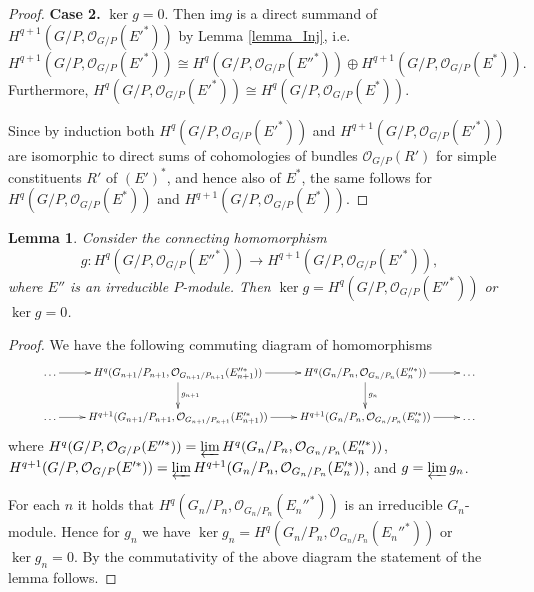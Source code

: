 \documentclass[12pt]{article}
\newcommand{\im} {\mathrm{im}}
\def \OO {{\mathcal O}}
\newtheorem{lemma}[theorem]{Lemma}
\begin{document}
\begin{proof}
{\bf Case 2.} $\ker g = 0$. Then $\im g$ is a direct summand of $H^{q+1}(G/P, \OO_{G/P}(E'^*))$ by Lemma \ref{lemma_Inj}, i.e. 
$$
H^{q+1}(G/P, \OO_{G/P}(E'^*)) \cong H^{q}(G/P, \OO_{G/P}(E''^*)) \oplus H^{q+1}(G/P, \OO_{G/P}(E^*)).
$$
Furthermore, $H^{q}(G/P, \OO_{G/P}(E'^*))\cong H^{q}(G/P, \OO_{G/P}(E^*))$.

Since by induction both $H^{q}(G/P, \OO_{G/P}(E'^*))$ and $H^{q+1}(G/P, \OO_{G/P}(E'^*))$ are isomorphic to direct sums of cohomologies of bundles $\OO_{G/P}(R')$ for simple constituents $R'$ of $(E')^*$, and hence also of $E^*$, the same follows for $H^{q}(G/P, \OO_{G/P}(E^*))$ and $H^{q+1}(G/P, \OO_{G/P}(E^*))$.
\end{proof}

\begin{lemma} \label{lemma_connectHom} Consider the connecting homomorphism 
$$
g: H^q(G/P, \OO_{G/P}(E''^*)) \rightarrow H^{q+1}(G/P, \OO_{G/P}(E'^*)),
$$
where $E''$ is an irreducible $P$-module. Then $\ker g = H^q(G/P, \OO_{G/P}(E''^*))$ or $\ker g = 0$.
\end{lemma}

\begin{proof}
We have the following commuting diagram of homomorphisms
\begin{equation*}
\xymatrix{
&\dots \ar[r] & H^q(G_{n+1}/P_{n+1}, \OO_{G_{n+1}/P_{n+1}}(E_{n+1}''^*)) \ar[d]^{g_{n+1}}\ar[r]&H^q(G_{n}/P_{n}, \OO_{G_{n}/P_{n}}(E_{n}''^*)) \ar[d]^{g_n}\ar[r]&\dots&\\
&\dots \ar[r] & H^{q+1}(G_{n+1}/P_{n+1}, \OO_{G_{n+1}/P_{n+1}}(E_{n+1}'^*))\ar[r]&H^{q+1}(G_{n}/P_{n}, \OO_{G_{n}/P_{n}}(E_{n}'^*))\ar[r]&\dots&\\
}
\end{equation*}
where $H^q(G/P, \OO_{G/P}(E''^*)) = \varprojlim H^q(G_{n}/P_{n}, \OO_{G_{n}/P_{n}}(E_{n}''^*))$, $H^{q+1}(G/P, \OO_{G/P}(E'^*)) = \varprojlim H^{q+1}(G_{n}/P_{n}, \OO_{G_{n}/P_{n}}(E_{n}'^*))$, and $g = \varprojlim g_n$. 

For each $n$ it holds that $H^q(G_{n}/P_{n}, \OO_{G_{n}/P_{n}}(E_{n}''^*))$ is an irreducible $G_n$-module. Hence for $g_n$ we have $\ker g_n = H^q(G_n/P_n, \OO_{G_n/P_n}(E_n''^*))$ or $\ker g_n = 0$. By the commutativity of the above diagram the statement of the lemma follows.
\end{proof}
\end{document}
